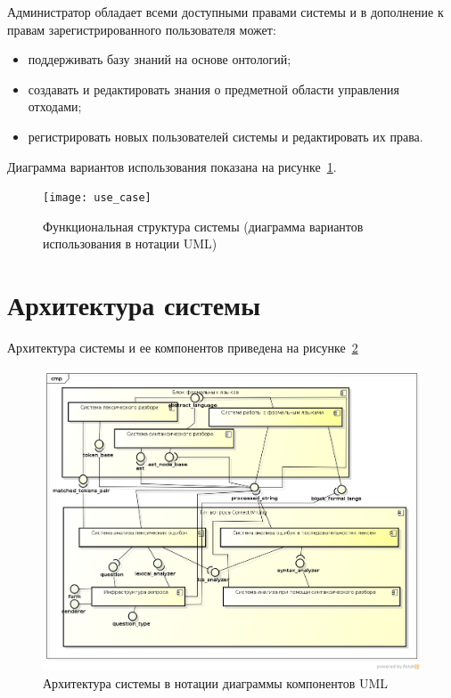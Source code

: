 \documentclass[a4paper]{G2-105}
\begin{document}
Администратор обладает всеми доступными правами системы и в дополнение к правам зарегистрированного пользователя может:
\begin{itemize}
\item поддерживать базу знаний на основе онтологий;
\item создавать и редактировать знания о предметной области управления отходами;
\item регистрировать новых пользователей системы и редактировать их права.
\end{itemize}

Диаграмма вариантов использования показана на рисунке~\ref{fig:use_case}.

\begin{figure}[H]
\centering
\texttt{[image: use\_case]}
\caption{Функциональная структура системы (диаграмма вариантов использования в нотации UML)}
\label{fig:use_case}
\end{figure}

\section{Архитектура системы}

Архитектура системы и ее компонентов приведена на рисунке~\ref{fig:architecture_backend}

\begin{figure}[H]
\centering
\includegraphics[scale=0.7]{component}
\caption{Архитектура системы в нотации диаграммы компонентов UML}
\label{fig:architecture_backend}
\end{figure}
\end{document}
